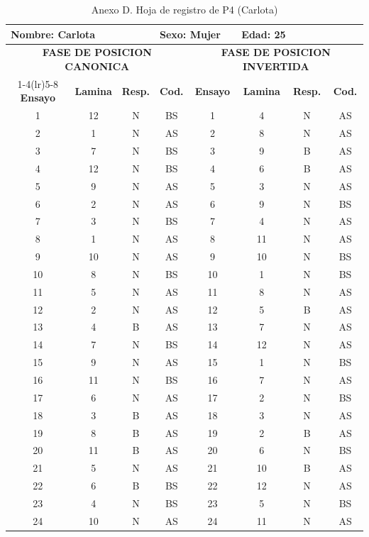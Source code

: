 \documentclass[stu, 12pt, letterpaper, donotrepeattitle, floatsintext, natbib]{apa7}
\begin{document}
\begin{table}[p]
\centering
\scriptsize
\caption{Anexo D. Hoja de registro de P4 (Carlota)}
\label{anexo:p4}
\begin{tabular}{cccccccc}
\toprule
\multicolumn{3}{l}{\textbf{Nombre:} Carlota} & \multicolumn{2}{l}{\textbf{Sexo:} Mujer} & \multicolumn{3}{l}{\textbf{Edad:} 25} \\
\midrule
\multicolumn{4}{c}{\textbf{FASE DE POSICION CANONICA}} & \multicolumn{4}{c}{\textbf{FASE DE POSICION INVERTIDA}} \\
\cmidrule(lr){1-4}\cmidrule(lr){5-8}
\textbf{Ensayo} & \textbf{Lamina} & \textbf{Resp.} & \textbf{Cod.} & \textbf{Ensayo} & \textbf{Lamina} & \textbf{Resp.} & \textbf{Cod.} \\
\midrule
1 & 12 & N & BS & 1 & 4 & N & AS \\
2 & 1 & N & AS & 2 & 8 & N & AS \\
3 & 7 & N & BS & 3 & 9 & B & AS \\
4 & 12 & N & BS & 4 & 6 & B & AS \\
5 & 9 & N & AS & 5 & 3 & N & AS \\
6 & 2 & N & AS & 6 & 9 & N & BS \\
7 & 3 & N & BS & 7 & 4 & N & AS \\
8 & 1 & N & AS & 8 & 11 & N & AS \\
9 & 10 & N & AS & 9 & 10 & N & BS \\
10 & 8 & N & BS & 10 & 1 & N & BS \\
11 & 5 & N & AS & 11 & 8 & N & AS \\
12 & 2 & N & AS & 12 & 5 & B & AS \\
13 & 4 & B & AS & 13 & 7 & N & AS \\
14 & 7 & N & BS & 14 & 12 & N & AS \\
15 & 9 & N & AS & 15 & 1 & N & BS \\
16 & 11 & N & BS & 16 & 7 & N & AS \\
17 & 6 & N & AS & 17 & 2 & N & BS \\
18 & 3 & B & AS & 18 & 3 & N & AS \\
19 & 8 & B & AS & 19 & 2 & B & AS \\
20 & 11 & B & AS & 20 & 6 & N & BS \\
21 & 5 & N & AS & 21 & 10 & B & AS \\
22 & 6 & B & BS & 22 & 12 & N & AS \\
23 & 4 & N & BS & 23 & 5 & N & BS \\
24 & 10 & N & AS & 24 & 11 & N & AS \\
\bottomrule
\end{tabular}
\end{table}
\end{document}
